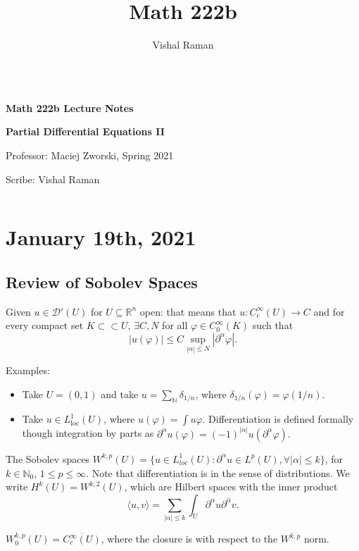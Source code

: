 \documentclass[12pt]{scrartcl}
\newcommand{\N}{\mathbb{N}}
\newcommand{\R}{\mathbb{R}}
\newcommand{\<}{\langle}
\renewcommand{\>}{\rangle}
\let \phi \varphi
\let \mc \mathcal
\begin{document}
\title{Math 222b}
\author{Vishal Raman}
\thispagestyle{empty}
$ $
\vfill
\begin{center}

\centerline{\huge \textbf{Math 222b Lecture Notes}}
\centerline{\Large \textbf{Partial Differential Equations II} } 
\centerline{Professor: Maciej Zworski, Spring 2021}
\centerline{Scribe: Vishal Raman}
\end{center}
\vfill
$ $
\newpage
\thispagestyle{empty}
\tableofcontents
\newpage
\section{January 19th, 2021}
\subsection{Review of Sobolev Spaces}
\begin{definition} Given $u \in \mc D'(U)$ for $U \subseteq \R^n$ open: that means that $u : C_c^\infty(U) \to C$ and for every compact set $K \subset \subset U$, $\exists C, N$ for all $\phi \in C_0^\infty(K)$ such that
$$|u(\phi)| \le C \sup_{|\alpha| \le N} |\partial^\alpha \phi|.$$ 
\end{definition}

Examples:
\begin{itemize}
\item Take $U =(0, 1)$ and take $u = \sum_{\N} \delta_{1/n}$, where $\delta_{1/n}(\phi) = \phi(1/n)$.  
\item Take $u \in L_{\text{loc}}^1(U)$, where $u(\phi) = \int u\phi$.  Differentiation is defined formally though integration by parts as $\partial^\alpha u(\phi) = (-1)^{|\alpha|} u(\partial^\alpha \phi).$
\end{itemize}

\begin{definition} The Sobolev spaces $W^{k, p}(U) = \{u \in L_{loc}^1(U) : \partial^\alpha u \in L^p(U), \forall |\alpha | \le k\}$, for $k \in \N_0$, $1 \le p \le \infty$.  Note that differentiation is in the sense of distributions.  We write $H^k(U) = W^{k, 2}(U)$, which are Hilbert spaces with the inner product$$\langle u, v\rangle = \sum_{|\alpha| \le k} \int_U \partial^\alpha u \overline{\partial^{\alpha} v}.$$
\end{definition}

\begin{definition} $W_0^{k, p}(U) = \overline{C_c^\infty(U)}$, where the closure is with respect to the $W^{k, p}$ norm.
\end{definition}
\end{document}
